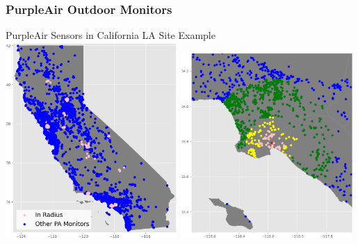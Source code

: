 \documentclass{beamer}
\begin{document}
\begin{frame}
\frametitle{PurpleAir Outdoor Monitors}
\hspace{1em}
PurpleAir Sensors in California 
\hspace{4em}
LA Site Example \\

\includegraphics[width=0.49\textwidth]{output/figures/pa/all_ca_and_15_pa_monitors.png}
\includegraphics[width=0.49\textwidth]{output/figures/concentric_ranges/county-037_site-4004_epa-pa-concentric-ranges.png}
\end{frame}
\end{document}
